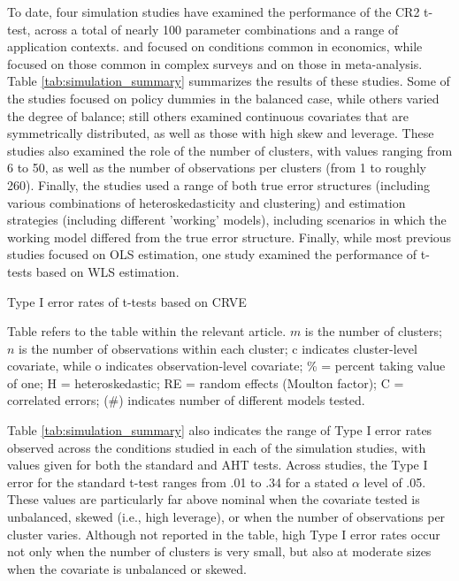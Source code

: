 \documentclass[12pt]{article}\usepackage[]{graphicx}\usepackage[]{color}
\begin{document}
To date, four simulation studies have examined the performance of the CR2 t-test, across a total of nearly 100 parameter combinations and a range of application contexts.
\citet{Cameron2015practitioners} and \citet{Imbens2015robust} focused on conditions common in economics, while \citet{Bell2002bias} focused on those common in complex surveys and \citet{Tipton2015small-t} on those in meta-analysis. 
Table \ref{tab:simulation_summary} summarizes the results of these studies.
Some of the studies focused on policy dummies in the balanced case, while others varied the degree of balance; still others examined continuous covariates that are symmetrically distributed, as well as those with high skew and leverage.
These studies also examined the role of the number of clusters, with values ranging from 6 to 50, as well as the number of observations per clusters (from 1 to roughly 260).
Finally, the studies used a range of both true error structures (including various combinations of heteroskedasticity and clustering) and estimation strategies (including different 'working' models), including scenarios in which the working model differed from the true error structure.
Finally, while most previous studies focused on OLS estimation, one study \citep{Tipton2015small-t} examined the performance of t-tests based on WLS estimation.

\begin{table}
\small
\caption{Type I error rates of t-tests based on CRVE}
\label{tab:simulation_summary}

\caption*{Table refers to the table within the relevant article. $m$ is the number of clusters; $n$ is the number of observations within each cluster; c indicates cluster-level covariate, while o indicates observation-level covariate; \% = percent taking value of one; H = heteroskedastic; RE = random effects (Moulton factor); C = correlated errors; (\#) indicates number of different models tested.}
\end{table}

Table \ref{tab:simulation_summary} also indicates the range of Type I error rates observed across the conditions studied in each of the simulation studies, with values given for both the standard and AHT tests.
Across studies, the Type I error for the standard t-test ranges from .01 to .34 for a stated $\alpha$ level of .05.
These values are particularly far above nominal when the covariate tested is unbalanced, skewed (i.e., high leverage), or when the number of observations per cluster varies. 
Although not reported in the table, high Type I error rates occur not only when the number of clusters is very small, but also at moderate sizes when the covariate is unbalanced or skewed. 
\end{document}
